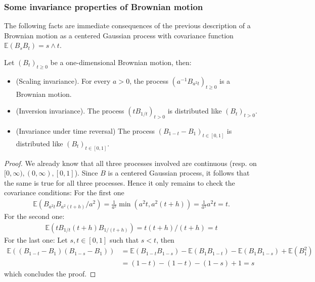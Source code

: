\documentclass[../mainfile.tex]{subfiles}
\begin{document}
\subsubsection{Some invariance properties of Brownian motion} The following facts are immediate consequences of the previous description of a Brownian motion as a centered Gaussian process with covariance function $\mathbb{E}(B_sB_t)=s \wedge t$. 
\begin{prop} Let $(B_t)_{t \geq 0}$ be a one-dimensional Brownian motion, then:
\begin{itemize}
\item (Scaling invariance). For every $a>0$, the process $(a^{-1} B_{a^2t})_{t \geq 0}$ is a Brownian motion.
\item (Inversion invariance). The process $(tB_{1/t})_{t > 0}$ is distributed like $(B_t)_{t >0}$.
\item (Invariance under time reversal) The process $(B_{1-t}-B_1)_{ t \in [0,1]}$ is distributed like $(B_t)_{t \in [0,1]}.$
\end{itemize}
\end{prop}
\begin{proof}
We already know that all three processes involved are continuous (resp. on $[0, \infty), (0, \infty), [0,1]$). Since $B$ is a centered Gaussian process, it follows that the same is true for all three processes. Hence it only remains to check the covariance conditions: For the first one
\begin{align*}
\mathbb{E}(B_{a^2t} B_{a^2(t+h)}/a^2)= \frac{1}{a^2} \min(a^2t, a^2(t+h))= \frac{1}{a^2}a^2t = t.
\end{align*}
For the second one:
\begin{align*}
 \mathbb{E}(tB_{1/t} (t+h)B_{1/(t+h)}) = t(t+h)/(t+h)=t
\end{align*}
For the last one: Let $s,t \in [0,1]$ such that $s<t$, then
\begin{align*}
\mathbb{E}((B_{1-t}-B_1)(B_{1-s}-B_1)) &= \mathbb{E}( B_{1-t}B_{1-s}) - \mathbb{E}(B_1B_{1-t}) - \mathbb{E}(B_1B_{1-s}) + \mathbb{E}(B_1^2) \\
&= (1-t) - (1-t) -(1-s)+1= s
\end{align*}
which concludes the proof.
\end{proof}
\end{document}
